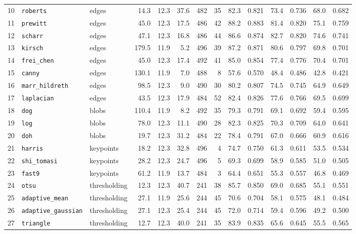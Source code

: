 \begin{landscape}
\begin{longtable}{@{}r >{\raggedright\arraybackslash\ttfamily}p{2.8cm} >{\raggedright\arraybackslash}p{1.7cm} r r r r r r r r r r r@{}}
10 & \texttt{roberts} & edges & 14.3 & 12.3 & 37.6 & 482 & 35 & 82.3 & 0.821 & 73.4 & 0.736 & 68.0 & 0.682 \\
11 & \texttt{prewitt} & edges & 45.0 & 12.3 & 17.5 & 486 & 42 & 88.2 & 0.883 & 81.4 & 0.820 & 75.1 & 0.759 \\
12 & \texttt{scharr} & edges & 47.1 & 12.3 & 16.8 & 486 & 44 & 86.6 & 0.874 & 82.7 & 0.820 & 74.6 & 0.741 \\
13 & \texttt{kirsch} & edges & 179.5 & 11.9 & 5.2 & 496 & 39 & 87.2 & 0.871 & 80.6 & 0.797 & 69.8 & 0.701 \\
14 & \texttt{frei\_chen} & edges & 45.0 & 12.3 & 17.4 & 492 & 41 & 85.0 & 0.854 & 77.4 & 0.776 & 70.4 & 0.701 \\
15 & \texttt{canny} & edges & 130.1 & 11.9 & 7.0 & 488 & 8 & 57.6 & 0.570 & 48.4 & 0.486 & 42.8 & 0.421 \\
16 & \texttt{marr\_hildreth} & edges & 98.5 & 12.3 & 9.0 & 490 & 30 & 80.2 & 0.807 & 74.5 & 0.745 & 64.9 & 0.649 \\
17 & \texttt{laplacian} & edges & 43.5 & 12.3 & 17.9 & 484 & 52 & 82.4 & 0.826 & 77.6 & 0.766 & 69.5 & 0.699 \\
18 & \texttt{dog} & blobs & 110.4 & 11.9 & 8.2 & 492 & 35 & 79.3 & 0.791 & 69.1 & 0.692 & 59.4 & 0.595 \\
19 & \texttt{log} & blobs & 78.0 & 12.3 & 11.1 & 490 & 28 & 82.3 & 0.825 & 70.3 & 0.709 & 64.0 & 0.641 \\
20 & \texttt{doh} & blobs & 19.7 & 12.3 & 31.2 & 484 & 22 & 78.4 & 0.791 & 67.0 & 0.666 & 60.9 & 0.616 \\
21 & \texttt{harris} & keypoints & 18.2 & 12.3 & 32.8 & 496 & 4 & 74.7 & 0.750 & 61.3 & 0.611 & 53.5 & 0.534 \\
22 & \texttt{shi\_tomasi} & keypoints & 28.2 & 12.3 & 24.7 & 496 & 5 & 69.3 & 0.699 & 58.9 & 0.585 & 51.0 & 0.505 \\
23 & \texttt{fast9} & keypoints & 61.2 & 11.9 & 13.7 & 484 & 3 & 64.4 & 0.651 & 55.3 & 0.557 & 46.8 & 0.469 \\
24 & \texttt{otsu} & thresholding & 12.3 & 12.3 & 40.7 & 241 & 38 & 85.7 & 0.850 & 69.0 & 0.685 & 55.1 & 0.551 \\
25 & \texttt{adaptive\_mean} & thresholding & 27.1 & 11.9 & 25.6 & 244 & 45 & 70.6 & 0.704 & 58.1 & 0.575 & 48.1 & 0.484 \\
26 & \texttt{adaptive\_gaussian} & thresholding & 27.1 & 12.3 & 25.4 & 244 & 45 & 72.0 & 0.714 & 59.4 & 0.596 & 49.2 & 0.500 \\
27 & \texttt{triangle} & thresholding & 12.7 & 12.3 & 40.0 & 241 & 35 & 83.9 & 0.835 & 65.6 & 0.645 & 55.5 & 0.565 \\

\end{longtable}
\end{landscape}
